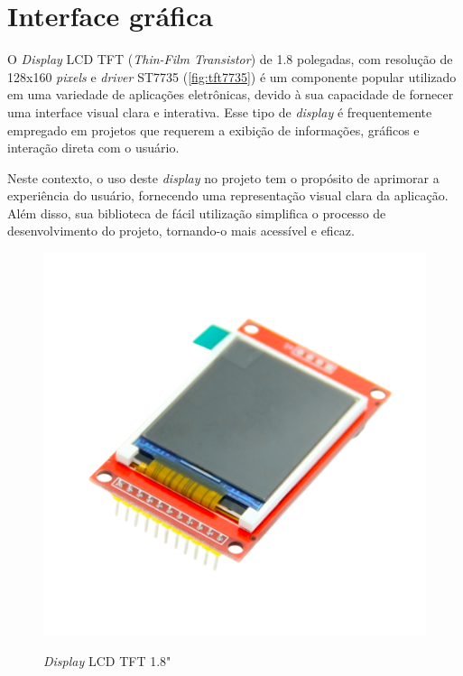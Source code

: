 \section{Interface gráfica}\label{sec:interface}

O \textit{Display} LCD TFT (\textit{Thin-Film Transistor}) de 1.8 polegadas, 
com resolução de 128x160 \textit{pixels}
e \textit{driver} ST7735 (\autoref{fig:tft7735}) é um componente popular 
utilizado em uma variedade de aplicações eletrônicas, devido à sua 
capacidade de fornecer uma interface visual clara e interativa. 
Esse tipo de \textit{display} é frequentemente empregado em projetos que requerem 
a exibição de informações, gráficos e interação direta com o usuário.

Neste contexto, o uso deste \textit{display} no projeto tem o propósito de aprimorar 
a experiência do usuário, fornecendo uma representação visual clara da 
aplicação. Além disso, sua biblioteca de fácil utilização simplifica o 
processo de desenvolvimento do projeto, tornando-o mais acessível e eficaz.

\begin{figure}[h!]
    \centering
    \caption{\textit{Display} LCD TFT 1.8"}
    \includegraphics[scale=0.4]{figuras/tftst7735.png}
    \label{fig:tft7735}
    \centering
\end{figure}

